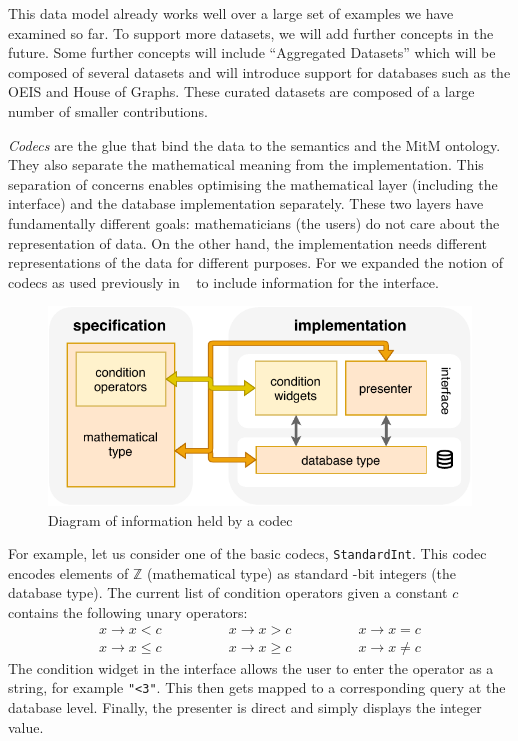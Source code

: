 This data model already works well over a large set of examples we have examined so far.
To support more datasets, we will add further concepts in the future.
Some further concepts will include ``Aggregated Datasets'' which will be composed of several datasets and will
introduce support for databases such as the OEIS and House of Graphs.
These curated datasets are composed of a large number of smaller contributions.

\medskip

\emph{Codecs} are the glue that bind the data to the semantics and the MitM ontology.
They also separate the mathematical meaning from the implementation.
This separation of concerns enables optimising the mathematical layer (including the interface)
and the database implementation separately.
These two layers have fundamentally different goals: 
mathematicians (the users) do not care about the representation of data.
On the other hand, the implementation needs 
different representations of the data for different purposes.
For \dmh we expanded the notion of codecs as used previously in \pn~\cite{WieKohRab:vtuimkb17}
to include information for the interface.
\begin{figure}[ht]
  \includegraphics{codec.pdf}
  \caption{Diagram of information held by a \dmh codec}\label{fig:codec}
\end{figure}


For example, let us consider one of the basic codecs, \texttt{StandardInt}.
This codec encodes elements of $\mathbb{Z}$ (mathematical type) 
as standard -bit integers (the database type).
The current list of condition operators given a constant $c$ contains the following unary operators:
$$
\begin{array}{ccc}
x \rightarrow x < c \qquad & \qquad x \rightarrow x > c \qquad & \qquad x \rightarrow x = c \\
x \rightarrow x \leq c \qquad & \qquad x \rightarrow x \geq c \qquad & \qquad x \rightarrow x \neq c
\end{array}
$$
The condition widget in the interface allows the user to enter the operator as a string,
for example \texttt{"<3"}.
This then gets mapped to a corresponding query at the database level.
Finally, the presenter is direct and simply displays the integer value.


